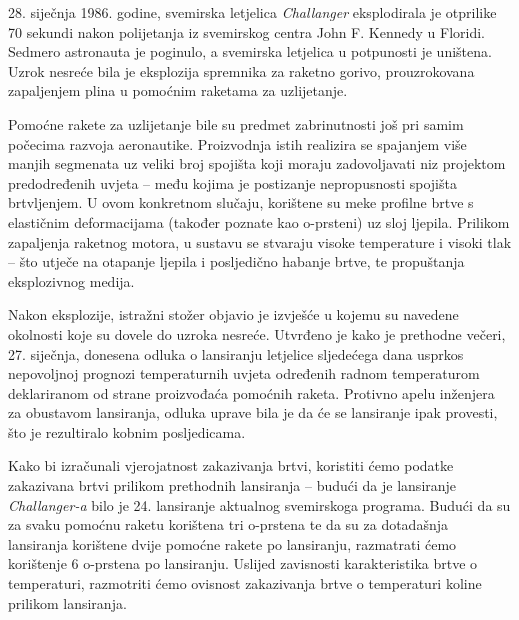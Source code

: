 \documentclass[a4paper,12pt,oneside]{memoir}
\begin{document}
        28. siječnja 1986. godine, svemirska letjelica \textit{Challanger} eksplodirala je otprilike 70 sekundi nakon polijetanja iz svemirskog centra John F. Kennedy u Floridi. Sedmero astronauta je poginulo, a svemirska letjelica u potpunosti je uništena. Uzrok nesreće bila je eksplozija spremnika za raketno gorivo, prouzrokovana zapaljenjem plina u pomoćnim raketama za uzlijetanje.

        Pomoćne rakete za uzlijetanje bile su predmet zabrinutnosti još pri samim počecima razvoja aeronautike. Proizvodnja istih realizira se spajanjem više manjih segmenata uz veliki broj spojišta koji moraju zadovoljavati niz projektom predodređenih uvjeta -- među kojima je postizanje nepropusnosti spojišta brtvljenjem. U ovom konkretnom slučaju, korištene su meke profilne brtve s elastičnim deformacijama (također poznate kao o-prsteni) uz sloj ljepila. Prilikom zapaljenja raketnog motora, u sustavu se stvaraju visoke temperature i visoki tlak -- što utječe na otapanje ljepila i posljedično habanje brtve, te propuštanja eksplozivnog medija.

        Nakon eksplozije, istražni stožer objavio je izvješće u kojemu su navedene okolnosti koje su dovele do uzroka nesreće. Utvrđeno je kako je prethodne večeri, 27. siječnja, donesena odluka o lansiranju letjelice sljedećega dana usprkos nepovoljnoj prognozi temperaturnih uvjeta određenih radnom temperaturom deklariranom od strane proizvođaća pomoćnih raketa. Protivno apelu inženjera za obustavom lansiranja, odluka uprave bila je da će se lansiranje ipak provesti, što je rezultiralo kobnim posljedicama.


        Kako bi izračunali vjerojatnost zakazivanja brtvi, koristiti ćemo podatke zakazivana brtvi prilikom prethodnih lansiranja -- budući da je lansiranje \textit{Challanger-a} bilo je 24. lansiranje aktualnog svemirskoga programa. Budući da su za svaku pomoćnu raketu korištena tri o-prstena te da su za dotadašnja lansiranja korištene dvije pomoćne rakete po lansiranju, razmatrati ćemo korištenje 6 o-prstena po lansiranju. Uslijed zavisnosti karakteristika brtve o temperaturi, razmotriti ćemo ovisnost zakazivanja brtve o temperaturi koline prilikom lansiranja.

        
\end{document}
